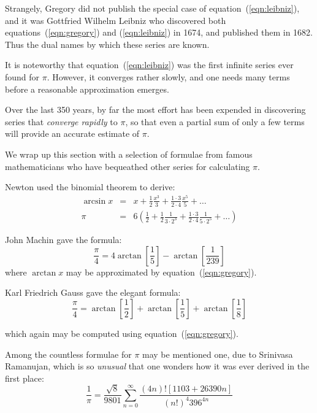 \documentclass[11pt,a4paper,onecolumn]{article}
\begin{document}
Strangely, Gregory did not publish the special case of
equation~(\ref{eqn:leibniz}), and it was Gottfried Wilhelm Leibniz who
discovered both equations~(\ref{eqn:gregory}) and (\ref{eqn:leibniz})
in 1674, and published them in 1682.  Thus the dual names by which these
series are known.  

It is noteworthy that equation~(\ref{eqn:leibniz}) was the
first infinite series ever found for $\pi$.  However, it converges rather slowly, and one needs many terms before a reasonable approximation emerges.

Over the last 350 years, by far the most effort has been expended in
discovering series that \emph{converge rapidly} to $\pi$, so that even
a partial sum of only a few terms will provide an accurate estimate of
$\pi$.

We wrap up this section with a selection of formulae from famous mathematicians who have bequeathed other series for calculating $\pi$.

Newton used the binomial theorem to derive: %
%
\begin{equation}
\begin{array}{lcl}
\arcsin x & = & x + \frac{1}{2}\frac{x^3}{3} + %
\frac{1\cdot 3}{2\cdot 4}\frac{x^5}{5} + \dots \\[0.5em]
\pi & = & 6\left( \frac{1}{2} + \frac{1}{2}\frac{1}{3 \cdot 2^3} + %
\frac{1 \cdot 3}{2 \cdot 4}\frac{1}{5 \cdot 2^5} + \dots\right)
\end{array}
\end{equation}

John Machin gave the formula: %
%
\begin{equation}
\frac{\pi}{4} = 4 \arctan \left[ \frac{1}{5} \right] %
- \arctan \left[ \frac{1}{239} \right]
\end{equation}
%
where $\arctan x$ may be approximated by equation~(\ref{eqn:gregory}).

Karl Friedrich Gauss gave the elegant formula: %
%
\begin{equation}
\frac{\pi}{4} = \arctan \left[\frac{1}{2}\right] + \arctan \left[\frac{1}{5}\right] + \arctan \left[\frac{1}{8}\right]
\label{eqn:gauss}
\end{equation}

which again may be computed using equation~(\ref{eqn:gregory}).

Among the countless formulae for $\pi$ may be mentioned one, due to Srinivasa Ramanujan, which is so \emph{unusual} that one wonders how it was ever derived in the first place: %
%
\begin{equation}
\frac{1}{\pi} = \frac{\sqrt 8}{9801}\sum_{n = 0}^{\infty}%
\frac{(4n)!\left[ 1103 + 26390n \right]}{(n!)^4 396^{4n}}
\end{equation}
\end{document}
